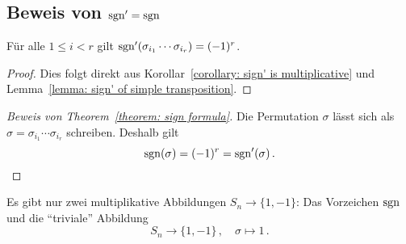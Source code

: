 \subsection*{Beweis von $\operatorname{sgn}' = \operatorname{sgn}$}

\begin{corollary}
  Für alle $1 \leq i < r$ gilt $\operatorname{sgn}'(\sigma_{i_1} \dotsm \sigma_{i_r}) = (-1)^r$.
\end{corollary}

\begin{proof}
  Dies folgt direkt aus Korollar~\ref{corollary: sign' is multiplicative} und Lemma~\ref{lemma: sign' of simple transposition}.
\end{proof}

\begin{proof}[Beweis von Theorem~\ref{theorem: sign formula}]
  Die Permutation $\sigma$ lässt sich als $\sigma = \sigma_{i_1} \dotsm \sigma_{i_r}$ schreiben.
  Deshalb gilt
  \[
      \operatorname{sgn}(\sigma)
    = (-1)^r
    = \operatorname{sgn}'(\sigma) \,.
    \qedhere
  \]
\end{proof}

\begin{remark}
  Es gibt nur zwei multiplikative Abbildungen $S_n \to \{1, -1\}$:
  Das Vorzeichen $\operatorname{sgn}$ und die \enquote{triviale} Abbildung
  \[
            S_n
    \to     \{1, -1\} \,,
    \quad   \sigma
    \mapsto 1 \,.
  \]

\end{remark}











